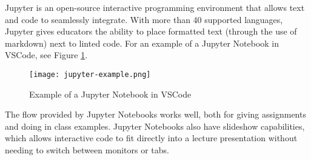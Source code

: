 Jupyter is an open-source interactive programming environment that allows text and code to 
seamlessly integrate. With more than 40 supported languages, Jupyter gives educators the ability
to place formatted text (through the use of markdown) next to linted code. For an example
of a Jupyter Notebook in VSCode, see Figure \ref{fig:jupyter_example}.

\begin{figure}[h]
    \texttt{[image: jupyter-example.png]}
    \centering
    \caption{Example of a Jupyter Notebook in VSCode}
    \centering
    \label{fig:jupyter_example}
\end{figure}

The flow provided by Jupyter Notebooks works well, both for giving assignments and
doing in class examples. Jupyter Notebooks also have slideshow capabilities, which allows 
interactive code to fit directly into a lecture presentation without needing to switch between
monitors or tabs.
